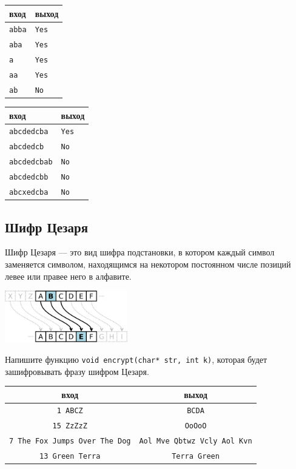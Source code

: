 \documentclass{article}
\begin{document}
\begin{multicols}{2}
\begin{center}
\begin{tabular}{ l | l }
 вход & выход \\ \hline
 \texttt{abba} & \texttt{Yes} \\
 \texttt{aba} & \texttt{Yes} \\
 \texttt{a} & \texttt{Yes} \\
 \texttt{aa} & \texttt{Yes} \\
 \texttt{ab} & \texttt{No} 
\end{tabular}
\end{center}


\begin{center}
\begin{tabular}{ l | l }
 вход & выход \\ \hline
 \texttt{abcdedcba} & \texttt{Yes} \\
 \texttt{abcdedcb} & \texttt{No} \\
 \texttt{abcdedcbab} & \texttt{No} \\
 \texttt{abcdedcbb} & \texttt{No} \\
 \texttt{abcxedcba} & \texttt{No}
\end{tabular}
\end{center}
\end{multicols}


\subsection{Шифр Цезаря}
Шифр Цезаря — это вид шифра подстановки, в котором каждый символ заменяется символом, находящимся на некотором постоянном числе позиций левее или правее него в алфавите. 
\begin{center}
\includegraphics[width=0.4\textwidth]{../images/caesar.png}
\end{center}
Напишите функцию \texttt{void encrypt(char* str, int k)}, которая будет зашифровывать фразу шифром Цезаря.
\begin{center}
\begin{tabular}{ c | c }
 вход & выход \\ \hline
 \texttt{1 ABCZ} & \texttt{BCDA}\\
 \texttt{15 ZzZzZ} & \texttt{OoOoO} \\
 \texttt{7 The Fox Jumps Over The Dog} & \texttt{Aol Mve Qbtwz Vcly Aol Kvn} \\
 \texttt{13  Green Terra} & \texttt{Terra Green}
\end{tabular}
\end{center}
\end{document}

